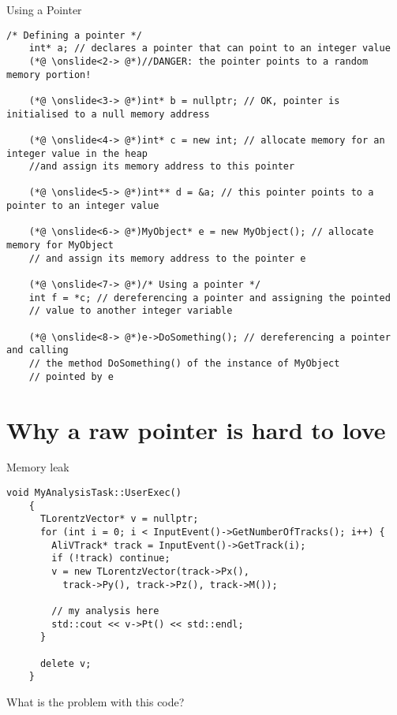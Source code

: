 \documentclass[xcolor={usenames,dvipsnames}]{beamer}
\begin{document}
\begin{frame}[fragile]{Using a Pointer}
\scriptsize
\begin{lstlisting}[style=base, gobble=4]
    /* Defining a pointer */
    int* a; // declares a pointer that can point to an integer value
    (*@ \onslide<2-> @*)//DANGER: the pointer points to a random memory portion!
    
    (*@ \onslide<3-> @*)int* b = nullptr; // OK, pointer is initialised to a null memory address

    (*@ \onslide<4-> @*)int* c = new int; // allocate memory for an integer value in the heap
    //and assign its memory address to this pointer
    
    (*@ \onslide<5-> @*)int** d = &a; // this pointer points to a pointer to an integer value
    
    (*@ \onslide<6-> @*)MyObject* e = new MyObject(); // allocate memory for MyObject
    // and assign its memory address to the pointer e
    
    (*@ \onslide<7-> @*)/* Using a pointer */
    int f = *c; // dereferencing a pointer and assigning the pointed
    // value to another integer variable
    
    (*@ \onslide<8-> @*)e->DoSomething(); // dereferencing a pointer and calling
    // the method DoSomething() of the instance of MyObject
    // pointed by e
\end{lstlisting}
\end{frame}

\section{Why a raw pointer is hard to love}

\begin{frame}[fragile]{Memory leak}
\scriptsize
\begin{lstlisting}[style=base, gobble=4]
    void MyAnalysisTask::UserExec()
    {
      TLorentzVector* v = nullptr;
      for (int i = 0; i < InputEvent()->GetNumberOfTracks(); i++) {
        AliVTrack* track = InputEvent()->GetTrack(i);
        if (!track) continue;
        v = new TLorentzVector(track->Px(), 
          track->Py(), track->Pz(), track->M());
    
        // my analysis here
        std::cout << v->Pt() << std::endl;
      }
  
      delete v;
    }
\end{lstlisting}
\small 
\begin{center}
What is the problem with this code?
\end{center}
\end{frame}
\end{document}

